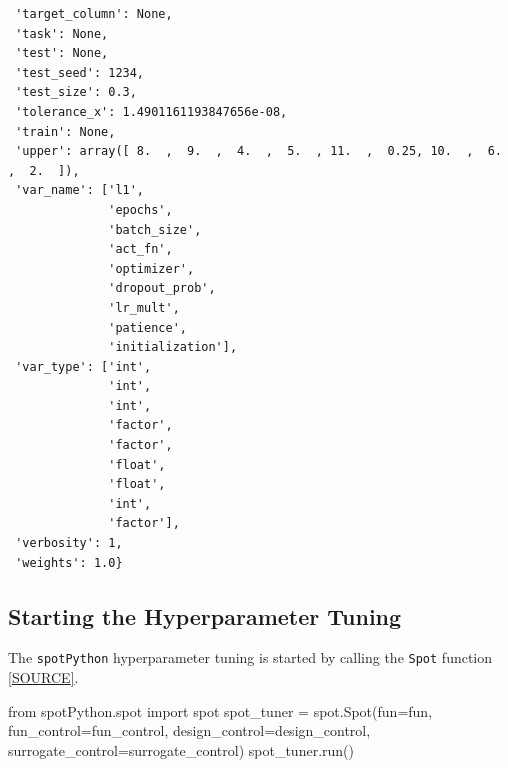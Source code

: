 \documentclass[
  letterpaper,
  DIV=11,
  numbers=noendperiod]{scrreprt}
\newenvironment{Shaded}{\begin{snugshade}}{\end{snugshade}}
\newcommand{\ImportTok}[1]{\textcolor[rgb]{0.00,0.46,0.62}{#1}}
\newcommand{\NormalTok}[1]{\textcolor[rgb]{0.00,0.23,0.31}{#1}}
\newcommand{\OperatorTok}[1]{\textcolor[rgb]{0.37,0.37,0.37}{#1}}
\begin{document}
\begin{verbatim}
 'target_column': None,
 'task': None,
 'test': None,
 'test_seed': 1234,
 'test_size': 0.3,
 'tolerance_x': 1.4901161193847656e-08,
 'train': None,
 'upper': array([ 8.  ,  9.  ,  4.  ,  5.  , 11.  ,  0.25, 10.  ,  6.  ,  2.  ]),
 'var_name': ['l1',
              'epochs',
              'batch_size',
              'act_fn',
              'optimizer',
              'dropout_prob',
              'lr_mult',
              'patience',
              'initialization'],
 'var_type': ['int',
              'int',
              'int',
              'factor',
              'factor',
              'float',
              'float',
              'int',
              'factor'],
 'verbosity': 1,
 'weights': 1.0}
\end{verbatim}

\subsection{Starting the Hyperparameter
Tuning}\label{sec-call-the-hyperparameter-tuner-33}

The \texttt{spotPython} hyperparameter tuning is started by calling the
\texttt{Spot} function
\href{https://github.com/sequential-parameter-optimization/spotPython/blob/main/src/spotPython/spot/spot.py}{{[}SOURCE{]}}.

\begin{Shaded}
\begin{Highlighting}[]
\ImportTok{from}\NormalTok{ spotPython.spot }\ImportTok{import}\NormalTok{ spot}
\NormalTok{spot\_tuner }\OperatorTok{=}\NormalTok{ spot.Spot(fun}\OperatorTok{=}\NormalTok{fun,}
\NormalTok{                       fun\_control}\OperatorTok{=}\NormalTok{fun\_control,}
\NormalTok{                       design\_control}\OperatorTok{=}\NormalTok{design\_control,}
\NormalTok{                       surrogate\_control}\OperatorTok{=}\NormalTok{surrogate\_control)}
\NormalTok{spot\_tuner.run()}
\end{Highlighting}
\end{Shaded}
\end{document}
